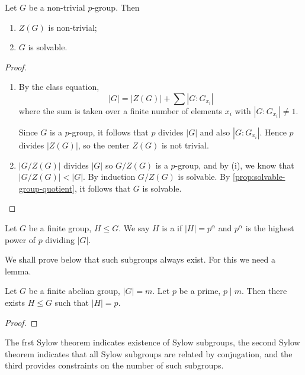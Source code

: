 \begin{proposition}
Let $G$ be a non-trivial $p$-group. Then
\begin{enumerate}[label=(\roman*)]
\item $Z(G)$ is non-trivial;
\item $G$ is solvable.
\end{enumerate}
\end{proposition}

\begin{proof} \
\begin{enumerate}[label=(\roman*)]
\item By the class equation,
\[|G|=|Z(G)|+\sum|G:G_{x_i}|\]
where the sum is taken over a finite number of elements $x_i$ with $|G:G_{x_i}|\neq1$.

Since $G$ is a $p$-group, it follows that $p$ divides $|G|$ and also $|G:G_{x_i}|$. Hence $p$ divides $|Z(G)|$, so the center $Z(G)$ is not trivial.

\item $|G/Z(G)|$ divides $|G|$ so $G/Z(G)$ is a $p$-group, and by (i), we know that $|G/Z(G)|<|G|$. By induction $G/Z(G)$ is solvable. By \ref{prop:solvable-group-quotient}, it follows that $G$ is solvable.
\end{enumerate}
\end{proof}

\begin{definition}
Let $G$ be a finite group, $H\le G$. We say $H$ is a  if $|H|=p^\alpha$ and $p^\alpha$ is the highest power of $p$ dividing $|G|$.
\end{definition}

We shall prove below that such subgroups always exist. For this we need a lemma.

\begin{lemma}
Let $G$ be a finite abelian group, $|G|=m$. Let $p$ be a prime, $p\mid m$. Then there exists $H\le G$ such that $|H|=p$.
\end{lemma}

\begin{proof}

\end{proof}

The frst Sylow theorem indicates existence of Sylow subgroups, the second Sylow theorem indicates that all Sylow subgroups are related by conjugation, and the third provides constraints on the number of such subgroups.


